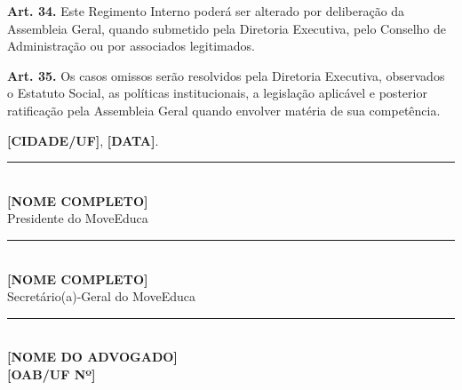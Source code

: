 \documentclass[11pt,a4paper]{article}
\begin{document}
\textbf{Art. 34.} Este Regimento Interno poderá ser alterado por deliberação da Assembleia Geral, quando submetido pela Diretoria Executiva, pelo Conselho de Administração ou por associados legitimados.

\textbf{Art. 35.} Os casos omissos serão resolvidos pela Diretoria Executiva, observados o Estatuto Social, as políticas institucionais, a legislação aplicável e posterior ratificação pela Assembleia Geral quando envolver matéria de sua competência.

\vspace{2cm}
\begin{center}
\textbf{[CIDADE/UF]}, \textbf{[DATA]}.

\vspace{2cm}
\rule{8cm}{0.4pt}\\
\textbf{[NOME COMPLETO]}\\
Presidente do MoveEduca

\vspace{1.5cm}
\rule{8cm}{0.4pt}\\
\textbf{[NOME COMPLETO]}\\
Secretário(a)-Geral do MoveEduca

\vspace{1.5cm}
\rule{8cm}{0.4pt}\\
\textbf{[NOME DO ADVOGADO]}\\
\textbf{[OAB/UF Nº]}
\end{center}
\end{document}
